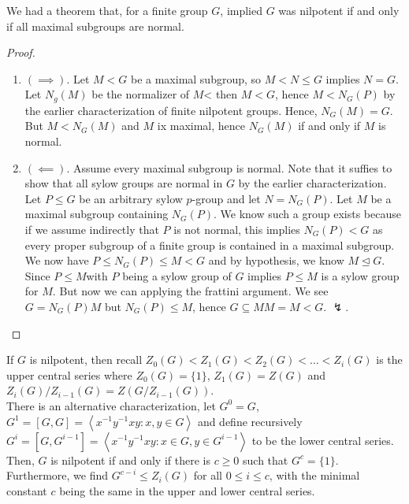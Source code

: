 \begin{recall}
	We had a theorem that, for a finite group \(G\), implied \(G\) was nilpotent if and only if all maximal subgroups are normal.
\end{recall}
\begin{proof}
	\begin{enumerate}
		\item \(\left( \implies \right) \). Let \(M < G\) be a maximal subgroup, so \(M < N \le G\) implies \(N = G\). Let \(N_{g}\left( M \right) \) be the normalizer of \(M\)< then \(M < G\), hence \(M < N_{G}\left( P \right) \) by the earlier characterization of finite nilpotent groups. Hence, \(N_{G}\left( M \right) = G\). But \(M < N_{G}\left( M \right) \) and \(M\) ix maximal, hence \(N_{G}\left( M \right) \) if and only if \(M\) is normal.
		\item \(\left( \impliedby \right) \). Assume every maximal subgroup is normal. Note that it suffies to show that all sylow groups are normal in \(G\) by the earlier characterization. Let \(P \le G\) be an arbitrary sylow \(p\)-group and let \(N = N_{G}\left( P \right) \). Let \(M\) be a maximal subgroup containing \(N_{G}\left( P \right) \). We know such a group exists because if we assume indirectly that \(P\) is not normal, this implies \(N_{G}\left( P \right) < G\) as every proper subgroup of a finite group is contained in a maximal subgroup.\\
			We now have \(P \le N_{G}\left( P \right) \le M < G\) and by hypothesis, we know \(M \trianglelefteq G\). Since \(P\le M\)with \(P\) being a sylow group of \(G\) implies \(P\le M\) is a sylow group for \(M\). But now we can applying the frattini argument. We see \(G = N_{G}\left( P \right) M\) but \(N_{G}\left( P \right) \le M\), hence \(G \subseteq MM = M < G\). \(\lightning\).
	\end{enumerate}
\end{proof}
\begin{remark}
	If \(G\) is nilpotent, then recall \(Z_0\left( G \right)  < Z_1\left( G \right) < Z_2\left( G \right)  < \ldots < Z_{i}\left( G \right) \) is the upper central series where \(Z_0 \left( G \right)  = \{1\} \), \(Z_1\left( G \right)  = Z\left( G \right) \) and \(Z_{i}\left( G \right)  / Z_{i - 1}\left( G \right)  = Z\left( G / Z_{i-1}\left( G \right)  \right) \).\\
	There is an alternative characterization, let \(G^{0}  = G\), \(G^{1} = \left[ G, G \right] = \left<x^{-1}y^{-1}xy : x, y \in G \right>  \) and define recursively \(G^{i} = \left[ G, G^{i-1} \right] = \left<x^{-1}y^{-1}xy : x\in G , y \in G^{i-1}\right>  \) to be the lower central series. Then, \(G\) is nilpotent if and only if there is \(c \ge 0\) such that \(G^{c} = \{1\} \). Furthermore, we find \(G^{c- i} \le Z_{i}\left( G \right) \) for all \(0\le i \le c\), with the minimal constant \(c\) being the same in the upper and lower central series.
\end{remark}
